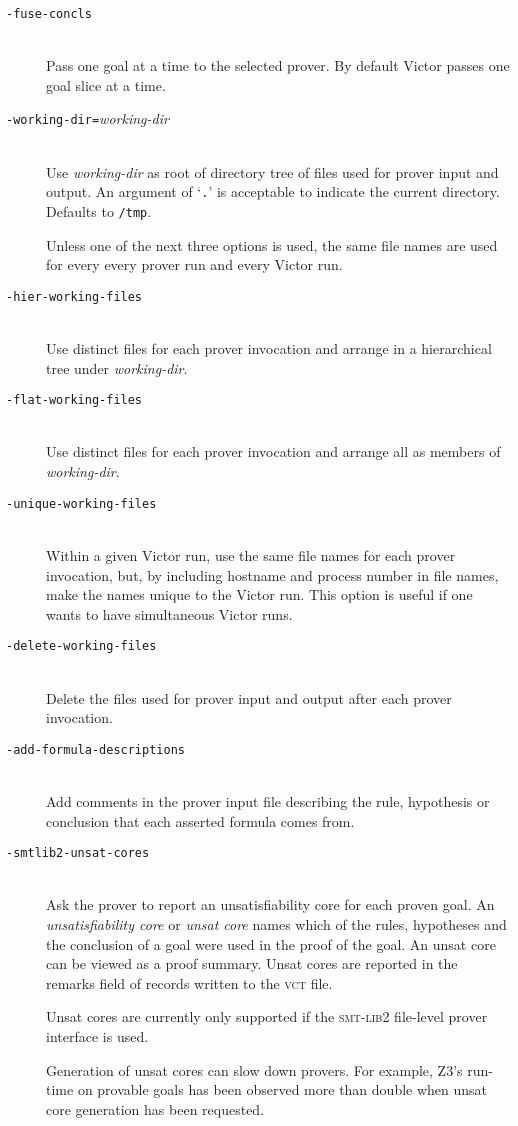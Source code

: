 \documentclass[12pt,fleqn]{article}
\newcommand{\zthree}{\textsc{Z}3}
\newcommand{\smtlib}{\textsc{smt-lib}}
\newcommand{\csv}{\textsc{vct}}
\newcommand{\optionb}[1]{\item[\texttt{-{#1}}]\ \\}
\newcommand{\optionv}[2]{\item[\texttt{-{#1}=}\mdseries\textit{#2}]\ \\}
\begin{document}
\begin{description}
\optionb{fuse-concls} 
  Pass one goal at a time to the selected prover.  By default Victor
  passes one goal slice at a time.

\optionv{working-dir}{working-dir} 
  Use \textit{working-dir} as root of directory tree of files used for prover
  input and output.   An argument of  `\texttt{.}' is acceptable to indicate
  the current directory.  Defaults to \texttt{/tmp}.  

  Unless one of the next three options is used, the same file
  names are used for every every prover run and every Victor run.

\optionb{hier-working-files}
   Use distinct files for each prover invocation and arrange in a
   hierarchical tree under \emph{working-dir}.

\optionb{flat-working-files}
   Use distinct files for each prover invocation and arrange all as 
   members of \emph{working-dir}.


\optionb{unique-working-files}
  Within a given Victor run, use the same file names for each prover
  invocation, but, by including hostname and process
  number in file names, make the names unique to the Victor run.
  This option is useful if one wants to have simultaneous Victor runs.

\optionb{delete-working-files}
  Delete the files used for prover input and output after
  each prover invocation.

\optionb{add-formula-descriptions} 
  Add comments in the prover input file describing the rule, hypothesis
  or conclusion that each asserted formula comes from.

\optionb{smtlib2-unsat-cores}
  Ask the prover to report an unsatisfiability core for each proven goal.
  An \emph{unsatisfiability core} or \emph{unsat core} names which of
  the rules, hypotheses and the conclusion of a goal were used in the
  proof of the goal.  An unsat core can be viewed as a proof summary.
  Unsat cores are reported in the remarks field of records written to the
  \csv{} file.

  Unsat cores are currently only supported if the \smtlib{}2 file-level
  prover interface is used.

  Generation of unsat cores can slow down provers.  For example,
  \zthree's run-time on provable goals has been observed more than
  double when unsat core generation has been requested.


\end{description}
\end{document}
